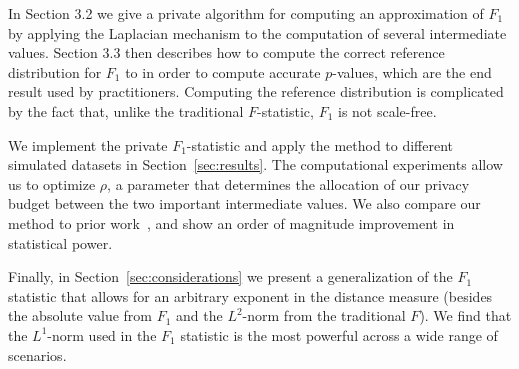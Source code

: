 In Section 3.2 we give a private algorithm for computing an approximation of $F_1$ by applying the Laplacian mechanism to the computation of several intermediate values.  Section 3.3 then describes how to compute the correct reference distribution for $F_1$ to in order to compute accurate $p$-values, which are the end result used by practitioners.  Computing the reference distribution is complicated by the fact that, unlike the traditional $F$-statistic, $F_1$ is not scale-free. 

We implement the private $F_1$-statistic and apply the method to different simulated datasets in Section~\ref{sec:results}.  The computational experiments allow us to optimize $\rho$, a parameter that determines the allocation of our privacy budget between the two important intermediate values.  We also compare our method to prior work~\cite{campbell2018diffprivanova}, and show an order of magnitude improvement in statistical power.


Finally, in Section~\ref{sec:considerations} we present a generalization of the $F_1$ statistic that allows for an arbitrary exponent in the distance measure (besides the absolute value from $F_1$ and the $L^2$-norm from the traditional $F$). We find that the $L^1$-norm used in the $F_1$ statistic is the most powerful across a wide range of scenarios.


